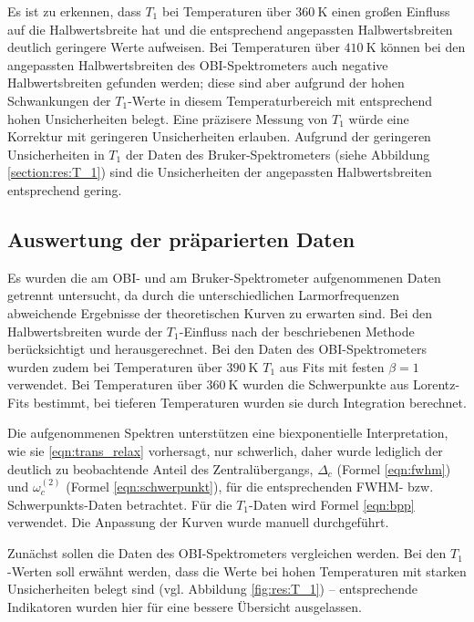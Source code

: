 Es ist zu erkennen, dass $T_1$ bei Temperaturen über $\SI{360}{\kelvin}$ einen großen Einfluss auf die Halbwertsbreite hat und die entsprechend angepassten Halbwertsbreiten deutlich geringere Werte aufweisen. Bei Temperaturen über $\SI{410}{\kelvin}$ können bei den angepassten Halbwertsbreiten des OBI-Spektrometers auch negative Halbwertsbreiten gefunden werden; diese sind aber aufgrund der hohen Schwankungen der $T_1$-Werte in diesem Temperaturbereich mit entsprechend hohen Unsicherheiten belegt. Eine präzisere Messung von $T_1$ würde eine Korrektur mit geringeren Unsicherheiten erlauben. Aufgrund der geringeren Unsicherheiten in $T_1$ der Daten des Bruker-Spektrometers (siehe Abbildung \ref{section:res:T_1}) sind die Unsicherheiten der angepassten Halbwertsbreiten entsprechend gering.


\subsection{Auswertung der präparierten Daten} \label{sub:res:auswertung}

Es wurden die am OBI- und am Bruker-Spektrometer aufgenommenen Daten getrennt untersucht, da durch die unterschiedlichen Larmorfrequenzen abweichende Ergebnisse der theoretischen Kurven zu erwarten sind. Bei den Halbwertsbreiten wurde der $T_1$-Einfluss nach der beschriebenen Methode berücksichtigt und herausgerechnet. Bei den Daten des OBI-Spektrometers wurden zudem bei Temperaturen über $\SI{390}{\kelvin}$ $T_1$ aus Fits mit festen $\beta = 1$ verwendet. Bei Temperaturen über $\SI{360}{\kelvin}$ wurden die Schwerpunkte aus Lorentz-Fits bestimmt, bei tieferen Temperaturen wurden sie durch Integration berechnet.

Die aufgenommenen Spektren unterstützen eine biexponentielle Interpretation, wie sie \eqref{eqn:trans_relax} vorhersagt, nur schwerlich, daher wurde lediglich der deutlich zu beobachtende Anteil des Zentralübergangs, $\Delta_c$ (Formel \eqref{eqn:fwhm}) und $\omega_c^{(2)}$ (Formel \eqref{eqn:schwerpunkt}), für die entsprechenden FWHM- bzw. Schwer\-punkts-Da\-ten betrachtet. Für die $T_1$-Daten wird Formel \eqref{eqn:bpp} verwendet. Die Anpassung der Kurven wurde manuell durchgeführt.



Zunächst sollen die Daten des OBI-Spektrometers vergleichen werden. Bei den $T_1$-Werten soll erwähnt werden, dass die Werte bei hohen Temperaturen mit starken Unsicherheiten belegt sind (vgl. Abbildung \ref{fig:res:T_1}) -- entsprechende Indikatoren wurden hier für eine bessere Übersicht ausgelassen.

